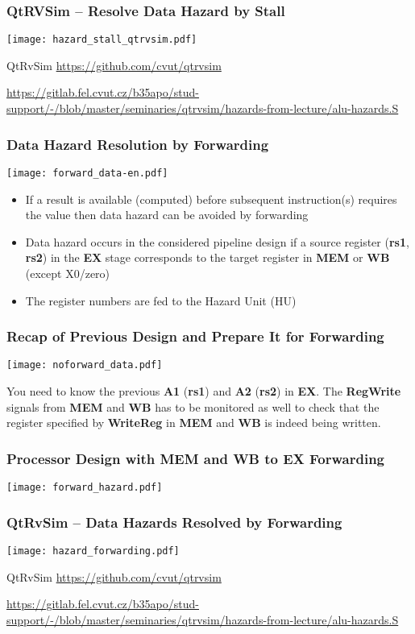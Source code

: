 \documentclass{beamer}
\begin{document}
\begin{frame}
\frametitle{QtRVSim -- Resolve Data Hazard by Stall}
\texttt{[image: hazard\_stall\_qtrvsim.pdf]}

{\tiny
QtRvSim \url{https://github.com/cvut/qtrvsim}
}

{\Tiny
\url{https://gitlab.fel.cvut.cz/b35apo/stud-support/-/blob/master/seminaries/qtrvsim/hazards-from-lecture/alu-hazards.S}
}

\end{frame}


\begin{frame}
\frametitle{Data Hazard Resolution by Forwarding}
\texttt{[image: forward\_data-en.pdf]}

\begin{itemize}
 \item If a result is available (computed) before subsequent instruction(s) requires the value then data hazard can be avoided by forwarding
 \item Data hazard occurs in the considered pipeline design if a source register
       (\textbf{rs1}, \textbf{rs2}) in the \textbf{EX} stage corresponds to the target register
       in \textbf{MEM} or \textbf{WB} (except X0/zero)
 \item The register numbers are fed to the Hazard Unit (HU)
\end{itemize}

\end{frame}

\begin{frame}
\frametitle{Recap of Previous Design and Prepare It for Forwarding}
\texttt{[image: noforward\_data.pdf]}

You need to know the previous \textbf{A1} (\textbf{rs1}) and \textbf{A2} (\textbf{rs2}) in \textbf{EX}.
The \textbf{RegWrite} signals from \textbf{MEM} and \textbf{WB} has to be monitored as well to check
that the register specified by \textbf{WriteReg} in \textbf{MEM} and \textbf{WB} is indeed being written.

\end{frame}

\begin{frame}
\frametitle{Processor Design with MEM and WB to EX Forwarding}
\texttt{[image: forward\_hazard.pdf]}
\end{frame}

\begin{frame}
\frametitle{QtRvSim -- Data Hazards Resolved by Forwarding}
\texttt{[image: hazard\_forwarding.pdf]}

{\tiny
QtRvSim \url{https://github.com/cvut/qtrvsim}
}

{\Tiny
\url{https://gitlab.fel.cvut.cz/b35apo/stud-support/-/blob/master/seminaries/qtrvsim/hazards-from-lecture/alu-hazards.S}
}

\end{frame}
\end{document}
